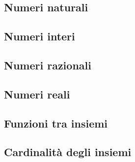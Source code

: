 \subsection{Numeri naturali}



\subsection{Numeri interi}



\subsection{Numeri razionali}



\subsection{Numeri reali}



\subsection{Funzioni tra insiemi}



\subsection{Cardinalità degli insiemi}

